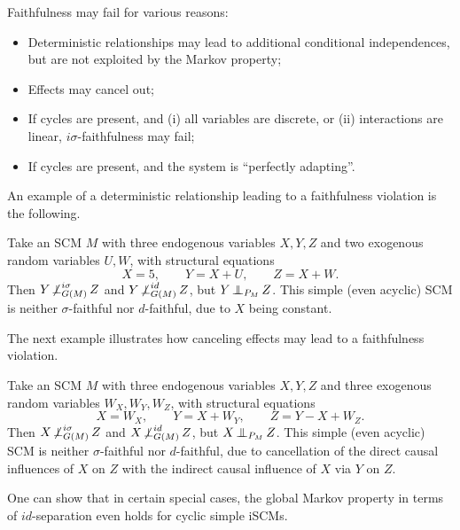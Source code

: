 Faithfulness may fail for various reasons:
\begin{itemize}
  \item Deterministic relationships may lead to additional conditional independences, but are not exploited by the Markov property;
  \item Effects may cancel out;
  \item If cycles are present, and (i) all variables are discrete, or (ii) interactions are linear, $i\sigma$-faithfulness may fail;
  \item If cycles are present, and the system is ``perfectly adapting''.
\end{itemize}

An example of a deterministic relationship leading to a faithfulness violation is the following.
\begin{Eg}
  Take an SCM $M$ with three endogenous variables $X,Y,Z$ and two exogenous random variables $U,W$, with structural equations
  $$X = 5, \qquad Y = X + U, \qquad Z = X + W.$$
  Then $Y \operatorname*{\not\perp}^{i\sigma}_{G(M)} Z$ and $Y \operatorname*{\not\perp}^{id}_{G(M)} Z$, but $Y \operatorname*{\perp\mkern-11mu\perp}_{P_M} Z$.
  This simple (even acyclic) SCM is neither $\sigma$-faithful nor $d$-faithful, due to $X$ being constant.
\end{Eg}
The next example illustrates how canceling effects may lead to a faithfulness violation.
\begin{Eg}
  Take an SCM $M$ with three endogenous variables $X,Y,Z$ and three exogenous random variables $W_X,W_Y,W_Z$, with structural equations
  $$X = W_X, \qquad Y = X + W_Y, \qquad Z = Y - X + W_Z.$$
  Then $X \operatorname*{\not\perp}^{i\sigma}_{G(M)} Z$ and $X \operatorname*{\not\perp}^{id}_{G(M)} Z$, but $X \operatorname*{\perp\mkern-11mu\perp}_{P_M} Z$.
  This simple (even acyclic) SCM is neither $\sigma$-faithful nor $d$-faithful, due to cancellation of the direct causal influences of $X$ on $Z$ with the indirect causal influence of $X$ via $Y$ on $Z$.
\end{Eg}
One can show that in certain special cases, the global Markov property in terms of $id$-separation even holds for cyclic simple iSCMs.
